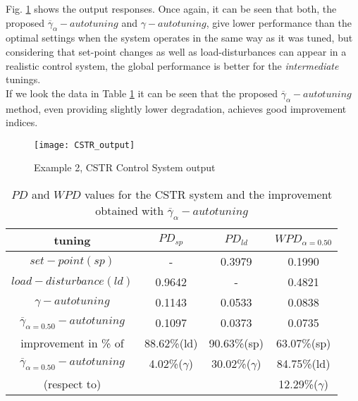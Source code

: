 Fig. \ref{example2_fig2} shows the output responses. Once again,
it can be seen that both, the proposed
$\overline{\gamma}_{\alpha}-autotuning$ and $\gamma-autotuning$,
give lower performance than the optimal settings when the system
operates in the same way as it was tuned, but considering that
set-point changes as well as load-disturbances can appear in a
realistic control system, the global performance is better for the
\emph{intermediate} tunings.\\

If we look the data in Table \ref{values_PDCSTR} it can be seen
that the proposed $\overline{\gamma}_{\alpha}-autotuning$ method,
even providing slightly lower degradation, achieves good
improvement indices.

\begin{figure}[htb!]
\centering
\texttt{[image: CSTR\_output]}
\caption{Example 2, CSTR Control System output}
\label{example2_fig2}
\end{figure}

\begin{table}[h!]
\begin{center}
\caption{$PD$ and $WPD$ values for the CSTR system and the
improvement obtained with $\overline{\gamma}_{\alpha}-autotuning$}
\begin{tabular}{c|ccc}
\hline \textbf{tuning}                        &$PD_{sp}$  &$PD_{ld}$ &$WPD_{\alpha=0.50}$\\
\hline
$set-point(sp)$                               &-          &0.3979    &0.1990 \\
$load-disturbance(ld)$                        &0.9642     &-         &0.4821 \\
$\gamma-autotuning$                           &0.1143     &0.0533    &0.0838 \\
$\overline{\gamma}_{\alpha=0.50}-autotuning$  &0.1097     &0.0373    &0.0735 \\
\hline \hline
improvement in \% of                         &88.62\%(ld)       &90.63\%(sp)       &63.07\%(sp) \\
$\overline{\gamma}_{\alpha=0.50}-autotuning$ & 4.02\%($\gamma$) &30.02\%($\gamma$) &84.75\%(ld) \\
(respect to)                                 &                  &                  &12.29\%($\gamma$) \\
\hline
\end{tabular}
\label{values_PDCSTR}
\end{center}
\end{table}
